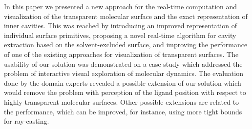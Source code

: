 In this paper we presented a new approach for the real-time computation and visualization of the transparent molecular surface and the exact representation of inner cavities. 
This was reached by introducing an improved representation of individual surface primitives, proposing a novel real-time algorithm for cavity extraction based on the solvent-excluded surface, and improving the performance of one of the existing approaches for visualization of transparent surfaces.
The usability of our solution was demonstrated on a case study which addressed the problem of interactive visual exploration of molecular dynamics.
The evaluation done by the domain experts revealed a possible extension of our solution which would remove the problem with perception of the ligand position with respect to highly transparent molecular surfaces.
Other possible extensions are related to the performance, which can be improved, for instance, using more tight bounds for ray-casting.
